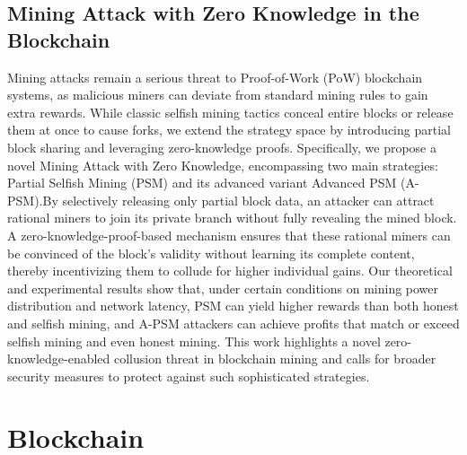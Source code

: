 \documentclass[11pt]{article}
\theoremstyle{definition}
\theoremstyle{remark}
\theoremstyle{plain}
\begin{document}
\subsection{\cite{10.1145/3708821.3733906} Mining Attack with Zero Knowledge in the Blockchain}
Mining attacks remain a serious threat to Proof-of-Work (PoW) blockchain systems, as malicious miners can deviate from standard mining rules to gain extra rewards. While classic selfish mining tactics conceal entire blocks or release them at once to cause forks, we extend the strategy space by introducing partial block sharing and leveraging zero-knowledge proofs. Specifically, we propose a novel Mining Attack with Zero Knowledge, encompassing two main strategies: Partial Selfish Mining (PSM) and its advanced variant Advanced PSM (A-PSM).By selectively releasing only partial block data, an attacker can attract rational miners to join its private branch without fully revealing the mined block. A zero-knowledge-proof-based mechanism ensures that these rational miners can be convinced of the block’s validity without learning its complete content, thereby incentivizing them to collude for higher individual gains. Our theoretical and experimental results show that, under certain conditions on mining power distribution and network latency, PSM can yield higher rewards than both honest and selfish mining, and A-PSM attackers can achieve profits that match or exceed selfish mining and even honest mining. This work highlights a novel zero-knowledge-enabled collusion threat in blockchain mining and calls for broader security measures to protect against such sophisticated strategies.


\section{Blockchain}
\end{document}
